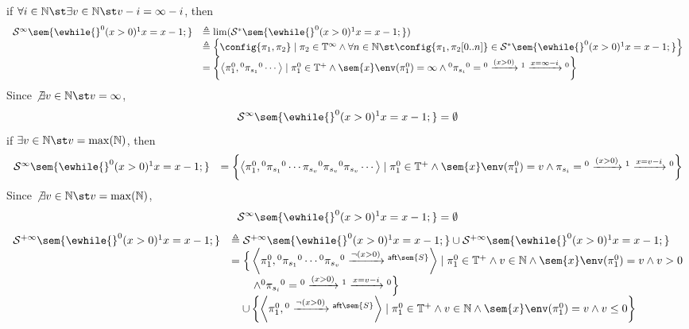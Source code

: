 \begin{example}
\[ \]
  if $\forall i \in \mathbb{N} \st \exists v \in \mathbb{N} \st 
  v - i = \infty - i$, then
 \[
 \begin{array}{ll}
  \mathcal{S}^{\infty}\sem{\ewhile {}^0 (x > 0) {}^1 x = x - 1;} 
  & \triangleq \lim(\mathcal{S}^*\sem{\ewhile {}^0 (x > 0) {}^1 x = x - 1;}) 
  \\
  & \triangleq \left\{ \config{\pi_1, \pi_2} \mid 
  \pi_2 \in \mathbb{T}^{\infty} \land \forall n \in \mathbb{N} \st \config{\pi_1, \pi_2[0..n]}\in \mathcal{S}^{*}\sem{\ewhile {}^0 (x > 0) {}^1 x = x - 1;}
  \right\}
  \\
  & = \left\{ \left< \pi_1^0, {}^0 \pi_{s_1} {}^0 \cdots \right>
 \mid \pi_1^0 \in \mathbb{T^{+}} \land
 \sem{x}\env(\pi_1^0) = \infty
 \land
 {}^0 \pi_{s_i} {}^0 = {}^0 \xrightarrow{(x > 0)} {}^1 \xrightarrow{x = \infty - i} {}^0
 \right\}
 \end{array}
 \]
  Since $\not\exists v \in \mathbb{N} \st v = \infty$, 
 \[
   \mathcal{S}^{\infty}
   \sem{\ewhile {}^0 (x > 0) {}^1 x = x - 1;}
   = \emptyset
 \]
 if $\exists v \in \mathbb{N} \st v = \max(\mathbb{N})$, then
  \[
 \begin{array}{ll}
  \mathcal{S}^{\infty}\sem{\ewhile {}^0 (x > 0) {}^1 x = x - 1;}
  &  = \left\{ \left< \pi_1^0, {}^0 \pi_{s_1} {}^0 \cdots \pi_{s_{v}} {}^0 \pi_{s_{v}} {}^0 \pi_{s_{v}} \cdots \right>
 \mid \pi_1^0 \in \mathbb{T^{+}} \land
 \sem{x}\env(\pi_1^0) = v
 \land
\pi_{s_i} = {}^0 \xrightarrow{(x > 0)} {}^1 \xrightarrow{x = v - i} {}^0
 \right\}
 \end{array}
 \]
 Since $\not\exists v \in \mathbb{N} \st v = \max(\mathbb{N})$, 
 \[
   \mathcal{S}^{\infty}\sem{\ewhile {}^0 (x > 0) {}^1 x = x - 1;}
   = \emptyset
 \]
  \[
 \begin{array}{ll}
  \mathcal{S}^{+\infty}\sem{\ewhile {}^0 (x > 0) {}^1 x = x - 1;} 
 &  \triangleq \mathcal{S}^{+\infty}\sem{\ewhile {}^0 (x > 0) {}^1 x = x - 1;} 
  \cup
  \mathcal{S}^{+\infty}\sem{\ewhile {}^0 (x > 0) {}^1 x = x - 1;}
  \\
   & = \Big\{ \left< \pi_1^0, {}^0 \pi_{s_1} {}^0 \cdots {}^0 \pi_{s_v} {}^0 \xrightarrow{\neg(x > 0)} {}^{\mathsf{aft}\sem{S}}\right>
 \mid \pi_1^0 \in \mathbb{T^{+}} \land v \in \mathbb{N} \land
 \sem{x}\env(\pi_1^0) = v
 \land v > 0  \\
 & \qquad \land
 {}^0 \pi_{s_i} {}^0 = {}^0 \xrightarrow{(x > 0)} {}^1 \xrightarrow{x = v - i} {}^0
 \Big\}
   \\ & \quad \cup 
 \left\{ \left< \pi_1^0, {}^0 \xrightarrow{\neg(x > 0)} {}^{\mathsf{aft}\sem{S}} \right> 
 \mid \pi_1^0 \in \mathbb{T^{+}} \land v \in \mathbb{N} \land
  \sem{x}\env(\pi_1^0) = v
 \land v \leq 0 \right\}
 \end{array}
 \]
 \end{example}

